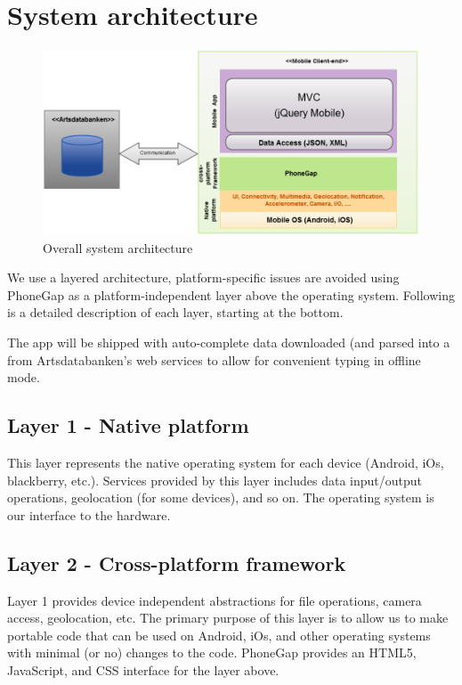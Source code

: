 \section{System architecture}
\begin{figure}[htb]
	\centering
	\includegraphics[width=1.0\textwidth]{architecture/architecture3.png}
	\caption{Overall system architecture}
	\label{fig:architecture}
\end{figure}

We use a layered architecture, platform-specific issues are avoided using
PhoneGap as a platform-independent layer above the operating system. Following
is a detailed description of each layer, starting at the bottom.

The app will be shipped with auto-complete data downloaded (and parsed into a  from Artsdatabanken's
web services to allow for convenient typing in offline mode.

\subsection{Layer 1 - Native platform}

This layer represents the native operating system for each device (Android, iOs,
blackberry, etc.). Services provided by this layer includes data input/output
operations, geolocation (for some devices), and so on. The operating system is
our interface to the hardware.

\subsection{Layer 2 - Cross-platform framework}

Layer 1 provides device independent abstractions for file operations, camera
access, geolocation, etc. The primary purpose of this layer is to allow us to
make portable code that can be used on Android, iOs, and other operating systems
with minimal (or no) changes to the code. PhoneGap provides an HTML5,
JavaScript, and CSS interface for the layer above.

